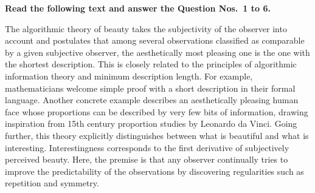 \begin{context}
\textbf{Read the following text and answer the Question Nos.~1 to 6.}\par\smallskip
The algorithmic theory of beauty takes the subjectivity of the observer into account and postulates that among several observations classified as comparable by a given subjective observer, the aesthetically most pleasing one is the one with the shortest description. This is closely related to the principles of algorithmic information theory and minimum description length. For example, mathematicians welcome simple proof with a short description in their formal language. Another concrete example describes an aesthetically pleasing human face whose proportions can be described by very few bits of information, drawing inspiration from 15th century proportion studies by Leonardo da Vinci. Going further, this theory explicitly distinguishes between what is beautiful and what is interesting. Interestingness corresponds to the first derivative of subjectively perceived beauty. Here, the premise is that any observer continually tries to improve the predictability of the observations by discovering regularities such as repetition and symmetry.
\end{context}
